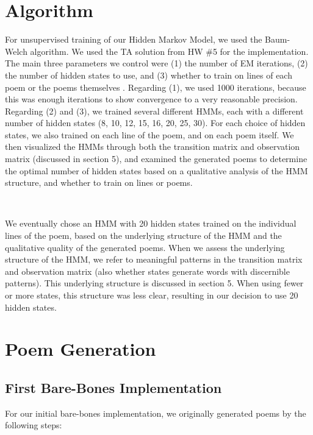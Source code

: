 \section{Algorithm}

\medskip

For unsupervised training of our Hidden Markov Model, we used the Baum-Welch algorithm. We used the TA solution from HW \#5 for the implementation. The main three parameters we control were (1) the number of EM iterations, (2) the number of hidden states to use, and (3) whether to train on lines of each poem or the poems themselves  . Regarding (1), we used 1000 iterations, because this was enough iterations to show convergence to a very reasonable precision. Regarding (2) and (3), we trained several different HMMs, each with a different number of hidden states (8, 10, 12, 15, 16, 20, 25, 30). For each choice of hidden states, we also trained on each line of the poem, and on each poem itself. We then visualized the HMMs through both the transition matrix and observation matrix  (discussed in section 5), and examined the generated poems to determine the optimal number of hidden states based on a qualitative analysis of the HMM structure, and whether to train on lines or poems.

~

We eventually chose an HMM with 20 hidden states trained on the individual lines of the poem, based on the underlying structure of the HMM and the qualitative quality of the generated poems. When we assess the underlying structure of the HMM, we refer to meaningful patterns in the transition matrix and observation matrix (also whether states generate words with discernible patterns). This underlying structure is discussed in section 5. When using fewer or more states, this structure was less clear, resulting in our decision to use 20 hidden states. 

\medskip

\section{Poem Generation}

\subsection*{First Bare-Bones Implementation}

For our initial bare-bones implementation, we originally generated poems by the following steps:

